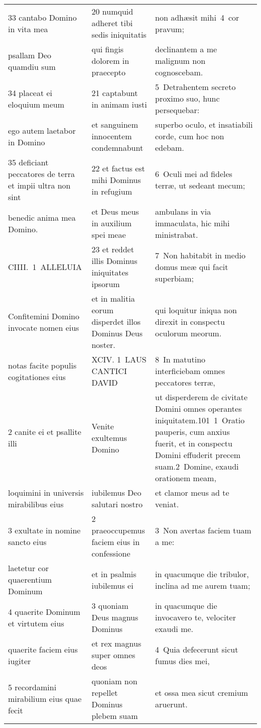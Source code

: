 \documentclass{article}
\begin{document}
\begin{longtable}{@{}p{}p{}p{}@{}}
33 cantabo Domino in vita mea	&	20 numquid adheret tibi sedis iniquitatis	&	non adhæsit mihi 4 cor pravum;	\\
psallam Deo quamdiu sum	&	qui fingis dolorem in praecepto	&	declinantem a me malignum non cognoscebam.	\\
34 placeat ei eloquium meum	&	21 captabunt in animam iusti	&	5 Detrahentem secreto proximo suo, hunc persequebar:	\\
ego autem laetabor in Domino	&	et sanguinem innocentem condemnabunt	&	superbo oculo, et insatiabili corde, cum hoc non edebam.	\\
35 deficiant peccatores de terra et impii ultra non sint	&	22 et factus est mihi Dominus in refugium	&	6 Oculi mei ad fideles terræ, ut sedeant mecum;	\\
benedic anima mea Domino.	&	et Deus meus in auxilium spei meae	&	ambulans in via immaculata, hic mihi ministrabat.	\\
CIIII. 1 ALLELUIA	&	23 et reddet illis Dominus iniquitates ipsorum	&	7 Non habitabit in medio domus meæ qui facit superbiam;	\\
Confitemini Domino invocate nomen eius	&	et in malitia eorum disperdet illos Dominus Deus noster.	&	qui loquitur iniqua non direxit in conspectu oculorum meorum.	\\
notas facite populis cogitationes eius	&	XCIV. 1 LAUS CANTICI DAVID	&	8 In matutino interficiebam omnes peccatores terræ,	\\
2 canite ei et psallite illi	&	Venite exultemus Domino	&	ut disperderem de civitate Domini omnes operantes iniquitatem.101 1 Oratio pauperis, cum anxius fuerit, et in conspectu Domini effuderit precem suam.2 Domine, exaudi orationem meam,	\\
loquimini in universis mirabilibus eius	&	iubilemus Deo salutari nostro	&	et clamor meus ad te veniat.	\\
3 exultate in nomine sancto eius	&	2 praeoccupemus faciem eius in confessione	&	3 Non avertas faciem tuam a me:	\\
laetetur cor quaerentium Dominum	&	et in psalmis iubilemus ei	&	in quacumque die tribulor, inclina ad me aurem tuam;	\\
4 quaerite Dominum et virtutem eius	&	3 quoniam Deus magnus Dominus	&	in quacumque die invocavero te, velociter exaudi me.	\\
quaerite faciem eius iugiter	&	et rex magnus super omnes deos	&	4 Quia defecerunt sicut fumus dies mei,	\\
5 recordamini mirabilium eius quae fecit	&	quoniam non repellet Dominus plebem suam	&	et ossa mea sicut cremium aruerunt.	\\

\end{longtable}
\end{document}

